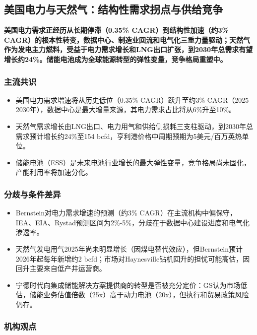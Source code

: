 \documentclass[11pt]{ctexart}
\begin{document}
\subsection{美国电力与天然气：结构性需求拐点与供给竞争}
\textbf{美国电力需求正经历从长期停滞（0.35\% CAGR）到结构性加速（约3\% CAGR）的根本性转变，数据中心、制造业回流和电气化三重力量驱动；天然气作为发电主力燃料，受益于电力需求增长和LNG出口扩张，到2030年总需求有望增长约24\%。储能电池成为全球能源转型的弹性变量，竞争格局重塑中。}
\subsubsection*{主流共识}
\begin{itemize}
  \item 美国电力需求增速将从历史低位（0.35\% CAGR）跃升至约3\% CAGR（2025-2030年），数据中心是最大增量来源，其电力需求占比将从6\%升至10\%。
  \item 天然气需求增长由LNG出口、电力用气和供给侧损耗三支柱驱动，到2030年总需求预计增长约24\%至154 bcfd，亨利港价格中周期预期为5美元/百万英热单位。
  \item 储能电池（ESS）是未来电池行业增长的最大弹性变量，竞争格局尚未固化，产能利用率将加速分化。
\end{itemize}
\subsubsection*{分歧与条件差异}
\begin{itemize}
  \item Bernstein对电力需求增速的预测（约3\% CAGR）在主流机构中偏保守，IEA、EIA、Rystad预测区间为2\%-5\%，分歧在于数据中心建设进度和电气化渗透率。
  \item 天然气发电用气2025年尚未明显增长（因煤电替代效应），但Bernstein预计2026年起每年新增约2 bcfd；市场对Haynesville钻机回升的担忧可能高估，因回升主要来自低产井运营商。
  \item 宁德时代向集成储能解决方案提供商的转型是否被充分定价：GS认为市场低估，储能业务估值倍数（25x）高于动力电池（20x），但执行和贸易政策风险仍存。
\end{itemize}
\subsubsection*{机构观点}
\end{document}
